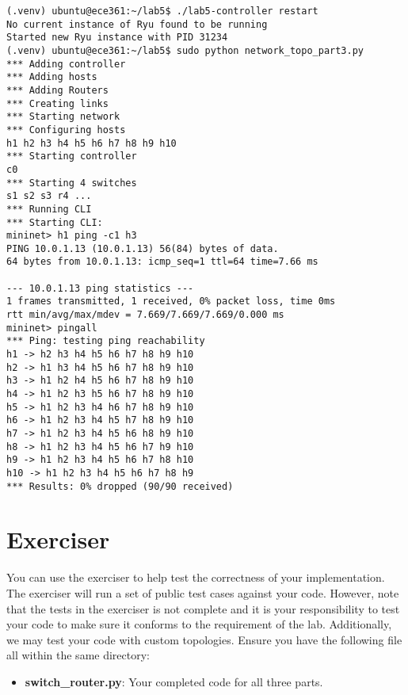 \documentclass[11pt]{article}
\begin{document}
\begin{lstlisting}[style=ece361shell, caption={Sample workflow for creating the topology in part 3 and testing the code.}, label={lst:start-mininet3}]
(.venv) ubuntu@ece361:~/lab5$ ./lab5-controller restart
No current instance of Ryu found to be running
Started new Ryu instance with PID 31234
(.venv) ubuntu@ece361:~/lab5$ sudo python network_topo_part3.py
*** Adding controller
*** Adding hosts
*** Adding Routers
*** Creating links
*** Starting network
*** Configuring hosts
h1 h2 h3 h4 h5 h6 h7 h8 h9 h10
*** Starting controller
c0
*** Starting 4 switches
s1 s2 s3 r4 ...
*** Running CLI
*** Starting CLI:
mininet> h1 ping -c1 h3
PING 10.0.1.13 (10.0.1.13) 56(84) bytes of data.
64 bytes from 10.0.1.13: icmp_seq=1 ttl=64 time=7.66 ms

--- 10.0.1.13 ping statistics ---
1 frames transmitted, 1 received, 0% packet loss, time 0ms
rtt min/avg/max/mdev = 7.669/7.669/7.669/0.000 ms
mininet> pingall
*** Ping: testing ping reachability
h1 -> h2 h3 h4 h5 h6 h7 h8 h9 h10
h2 -> h1 h3 h4 h5 h6 h7 h8 h9 h10
h3 -> h1 h2 h4 h5 h6 h7 h8 h9 h10
h4 -> h1 h2 h3 h5 h6 h7 h8 h9 h10
h5 -> h1 h2 h3 h4 h6 h7 h8 h9 h10
h6 -> h1 h2 h3 h4 h5 h7 h8 h9 h10
h7 -> h1 h2 h3 h4 h5 h6 h8 h9 h10
h8 -> h1 h2 h3 h4 h5 h6 h7 h9 h10
h9 -> h1 h2 h3 h4 h5 h6 h7 h8 h10
h10 -> h1 h2 h3 h4 h5 h6 h7 h8 h9
*** Results: 0% dropped (90/90 received)
\end{lstlisting}

\section{Exerciser}
\label{sec:exercise}
You can use the exerciser to help test the correctness of your implementation. The exerciser will run a set of public test cases against your code.
However, note that the tests in the exerciser is not complete and it is your responsibility to test your code to make sure it conforms to the requirement of the lab.
Additionally, we may test your code with custom topologies.
Ensure you have the following file all within the same directory:
\begin{itemize}
    \item \textbf{switch\_router.py}: Your completed code for all three parts.
\end{itemize}
\end{document}
